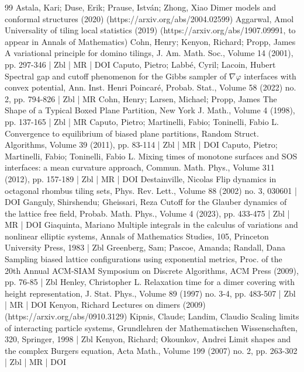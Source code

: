 \documentclass[10pt]{amsart}
\theoremstyle{definition}\newtheorem{defi}[theo]{Definition}\newtheorem{rema}[theo]{Remark}\newtheorem{exam}[theo]{Example}\newtheorem{exem}[theo]{Example}\newtheorem{nota}[theo]{Notation}
\begin{document}
\begin{thebibliography}{99}
Astala, Kari; Duse, Erik; Prause, István; Zhong, Xiao Dimer models and conformal structures (2020) (https://arxiv.org/abs/2004.02599)
Aggarwal, Amol Universality of tiling local statistics (2019) (https://arxiv.org/abs/1907.09991, to appear in Annals of Mathematics)
Cohn, Henry; Kenyon, Richard; Propp, James A variational principle for domino tilings, J. Am. Math. Soc., Volume 14 (2001), pp. 297-346 | Zbl | MR | DOI
Caputo, Pietro; Labbé, Cyril; Lacoin, Hubert Spectral gap and cutoff phenomenon for the Gibbs sampler of $\nabla \varphi $ interfaces with convex potential, Ann. Inst. Henri Poincaré, Probab. Stat., Volume 58 (2022) no. 2, pp. 794-826 | Zbl | MR
Cohn, Henry; Larsen, Michael; Propp, James The Shape of a Typical Boxed Plane Partition, New York J. Math., Volume 4 (1998), pp. 137-165 | Zbl | MR
Caputo, Pietro; Martinelli, Fabio; Toninelli, Fabio L. Convergence to equilibrium of biased plane partitions, Random Struct. Algorithms, Volume 39 (2011), pp. 83-114 | Zbl | MR | DOI
Caputo, Pietro; Martinelli, Fabio; Toninelli, Fabio L. Mixing times of monotone surfaces and SOS interfaces: a mean curvature approach, Commun. Math. Phys., Volume 311 (2012), pp. 157-189 | Zbl | MR | DOI
Destainville, Nicolas Flip dynamics in octagonal rhombus tiling sets, Phys. Rev. Lett., Volume 88 (2002) no. 3, 030601 | DOI
Ganguly, Shirshendu; Gheissari, Reza Cutoff for the Glauber dynamics of the lattice free field, Probab. Math. Phys., Volume 4 (2023), pp. 433-475 | Zbl | MR | DOI
Giaquinta, Mariano Multiple integrals in the calculus of variations and nonlinear elliptic systems, Annals of Mathematics Studies, 105, Princeton University Press, 1983 | Zbl
Greenberg, Sam; Pascoe, Amanda; Randall, Dana Sampling biased lattice configurations using exponential metrics, Proc. of the 20th Annual ACM-SIAM Symposium on Discrete Algorithms, ACM Press (2009), pp. 76-85 | Zbl
Henley, Christopher L. Relaxation time for a dimer covering with height representation, J. Stat. Phys., Volume 89 (1997) no. 3-4, pp. 483-507 | Zbl | MR | DOI
Kenyon, Richard Lectures on dimers (2009) (https://arxiv.org/abs/0910.3129)
Kipnis, Claude; Landim, Claudio Scaling limits of interacting particle systems, Grundlehren der Mathematischen Wissenschaften, 320, Springer, 1998 | Zbl
Kenyon, Richard; Okounkov, Andrei Limit shapes and the complex Burgers equation, Acta Math., Volume 199 (2007) no. 2, pp. 263-302 | Zbl | MR | DOI

\end{thebibliography}
\end{document}
